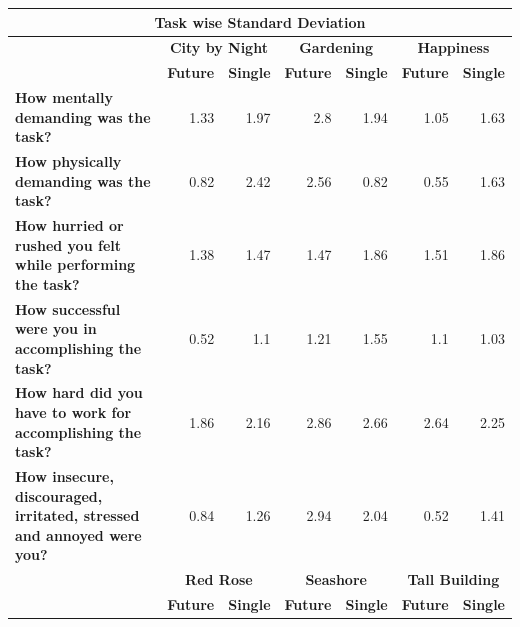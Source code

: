 \documentclass[english]{tktltiki}
\begin{document}
\begin{table}
	\small
	\begin{center}
    \begin{tabular}{|p{6cm}|r|r|r|r|r|r|}
        \hline
        \multicolumn{7}{|c|}{\textbf{Task wise Standard Deviation}} \\
        \hline
        
        \multicolumn{1}{|c|}{} & \multicolumn{2}{|c|}{\textbf{City by Night}} & \multicolumn{2}{|c|}{\textbf{Gardening}} & \multicolumn{2}{|c|}{\textbf{Happiness}} \\
        \hline
        
        \multicolumn{1}{|c|}{} & \multicolumn{1}{|c|}{\textbf{Future}} & \multicolumn{1}{|c|}{\textbf{Single}} & \multicolumn{1}{|c|}{\textbf{Future}} & \multicolumn{1}{|c|}{\textbf{Single}} & \multicolumn{1}{|c|}{\textbf{Future}} & \multicolumn{1}{|c|}{\textbf{Single}} \\
        \hline
        
        \textbf{How mentally demanding was the task?} & 1.33 & 1.97 & 2.8 & 1.94 & 1.05 & 1.63 \\
        \hline
        
        \textbf{How physically demanding was the task?} & 0.82 & 2.42 & 2.56 & 0.82 & 0.55 & 1.63 \\
        \hline
        
        \textbf{How hurried or rushed you felt while performing the task?} & 1.38 & 1.47 & 1.47 & 1.86 & 1.51 & 1.86 \\
        \hline
        
        \textbf{How successful were you in accomplishing the task?} & 0.52 & 1.1 & 1.21 & 1.55 & 1.1 & 1.03 \\
        \hline
        
        \textbf{How hard did you have to work for accomplishing the task?} & 1.86 & 2.16 & 2.86 & 2.66 & 2.64 & 2.25 \\
        \hline
        
        \textbf{How insecure, discouraged, irritated, stressed and annoyed were you?} & 0.84 & 1.26 & 2.94 & 2.04 & 0.52 & 1.41 \\
        \hline
        \hline
        \multicolumn{1}{|c|}{} & \multicolumn{2}{|c|}{\textbf{Red Rose}} & \multicolumn{2}{|c|}{\textbf{Seashore}} & \multicolumn{2}{|c|}{\textbf{Tall Building}} \\
        \hline
        
        \multicolumn{1}{|c|}{} & \multicolumn{1}{|c|}{\textbf{Future}} & \multicolumn{1}{|c|}{\textbf{Single}} & \multicolumn{1}{|c|}{\textbf{Future}} & \multicolumn{1}{|c|}{\textbf{Single}} & \multicolumn{1}{|c|}{\textbf{Future}} & \multicolumn{1}{|c|}{\textbf{Single}} \\
        \hline
        

\end{tabular}
\end{center}
\end{table}
\end{document}
